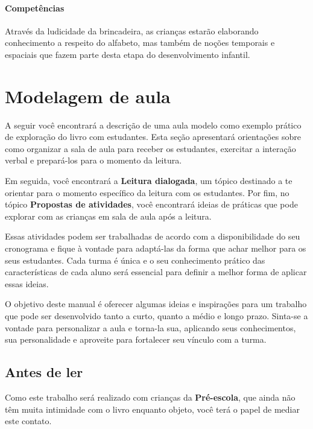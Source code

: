 \documentclass[11pt]{extarticle}
\begin{document}
\paragraph{Competências} 
Através da ludicidade da brincadeira, as crianças estarão elaborando
conhecimento a respeito do alfabeto, mas também de noções temporais e
espaciais que fazem parte desta etapa do desenvolvimento infantil. 

\section{Modelagem de aula}
A seguir você encontrará a descrição de uma aula modelo como exemplo 
prático de exploração do livro com estudantes. Esta seção apresentará 
orientações sobre como organizar a sala de aula para receber os 
estudantes, exercitar a interação verbal e prepará-los para o 
momento da leitura.

Em seguida, você encontrará a \textbf{Leitura dialogada}, um 
tópico destinado a te orientar para o momento específico da 
leitura com os estudantes. Por fim, no tópico 
\textbf{Propostas de atividades}, você encontrará ideias 
de práticas que pode explorar com as crianças em sala de 
aula após a leitura. 

Essas atividades podem ser trabalhadas de acordo com a 
disponibilidade do seu cronograma e fique à vontade para adaptá-las 
da forma que achar melhor para os seus estudantes. Cada turma é única 
e o seu conhecimento prático das características de cada aluno será 
essencial para definir a melhor forma de aplicar essas ideias. 

O objetivo deste manual é oferecer algumas ideias 
e inspirações para um trabalho que pode ser desenvolvido tanto 
a curto, quanto a médio e longo prazo. Sinta-se a vontade para 
personalizar a aula e torna-la sua, aplicando seus conhecimentos, sua 
personalidade e aproveite para fortalecer 
seu vínculo com a turma.


\subsection{Antes de ler}


Como este trabalho será realizado com crianças da \textbf{Pré-escola}, 
que ainda não têm muita intimidade com o livro enquanto objeto, você terá o 
papel de mediar este contato. 
\end{document}
